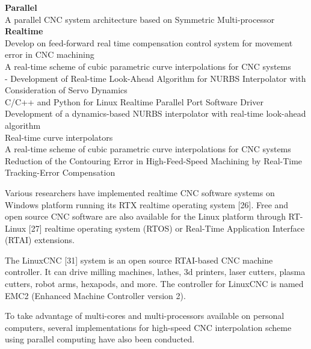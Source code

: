 \begin{tcolorbox}
	
\textbf{Parallel}\\
\cite{Hongya_2016} A parallel CNC system architecture based on Symmetric Multi-processor\\ 




\textbf{Realtime}\\

\cite{Weihua_Li_2010} Develop on feed-forward real time compensation control system for movement error in CNC machining\\
\cite{Bahr_2001} A real-time scheme of cubic parametric curve interpolations for CNC systems\\
\cite{Lin_2007-02} - Development of Real-time Look-Ahead Algorithm for NURBS Interpolator with Consideration of Servo Dynamics\\	
\cite{FYP_Abzal_2012} C/C++ and Python for Linux Realtime Parallel Port Software Driver \\
\cite{Lin_2007-01}	Development of a dynamics-based NURBS interpolator with real-time look-ahead algorithm\\
\cite{Shpiltani_1994} Real-time curve interpolators\\
\cite{Bahr_2001} A real-time scheme of cubic parametric curve interpolations for CNC systems\\
\cite{Ma_2017}	Reduction of the Contouring Error in High-Feed-Speed Machining by Real-Time Tracking-Error Compensation\\

\end{tcolorbox}

Various researchers have implemented realtime CNC software systems on Windows platform running its RTX realtime operating system [26]. Free and open source CNC software are also available for the Linux platform through RT-Linux [27] realtime operating system (RTOS) or Real-Time Application Interface (RTAI) extensions. 
\vspace*{1\baselineskip}

The LinuxCNC [31] system is an open source RTAI-based CNC machine controller. It can drive milling machines, lathes, 3d printers, laser cutters, plasma cutters, robot arms, hexapods, and more. The controller for LinuxCNC is named EMC2 (Enhanced Machine Controller version 2).
\vspace*{1\baselineskip}

To take advantage of multi-cores and multi-processors available on personal computers, several implementations for high-speed CNC interpolation scheme using parallel computing have also been conducted. 
\vspace*{1\baselineskip}


